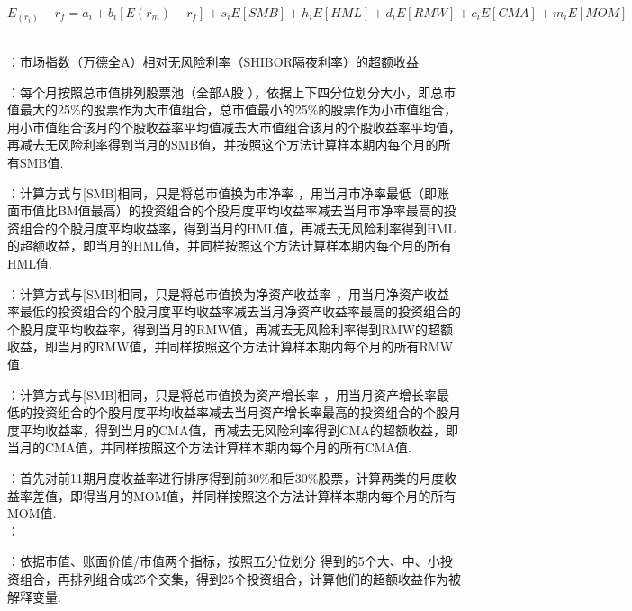 \documentclass[11pt]{article}
\begin{document}
    \noindent {}
    $$E_( r_i)-r_f=a_i+b_i [E(r_m)-r_f]+s_i E[SMB]+h_i E[HML]+d_i E[RMW]+c_i E[CMA]+m_i E[MOM]$$
    \\
    \par \indent
    \heiti{$[E(r_m)-r_f]$}：市场指数（万德全A）相对无风险利率（SHIBOR隔夜利率）的超额收益\\
    \par \indent
    \heiti{$[SMB]$}：每个月按照总市值排列股票池（全部A股  ），依据上下四分位划分大小，即总市值最大的25\%的股票作为大市值组合，总市值最小的25\%的股票作为小市值组合，用小市值组合该月的个股收益率平均值减去大市值组合该月的个股收益率平均值，再减去无风险利率得到当月的SMB值，并按照这个方法计算样本期内每个月的所有SMB值.\\
    \par \indent
    \heiti{$[HML]$}：计算方式与[SMB]相同，只是将总市值换为市净率 ，用当月市净率最低（即账面市值比BM值最高）的投资组合的个股月度平均收益率减去当月市净率最高的投资组合的个股月度平均收益率，得到当月的HML值，再减去无风险利率得到HML的超额收益，即当月的HML值，并同样按照这个方法计算样本期内每个月的所有HML值.\\
    \par \indent
    \heiti{$[RMW]$}：计算方式与[SMB]相同，只是将总市值换为净资产收益率 ，用当月净资产收益率最低的投资组合的个股月度平均收益率减去当月净资产收益率最高的投资组合的个股月度平均收益率，得到当月的RMW值，再减去无风险利率得到RMW的超额收益，即当月的RMW值，并同样按照这个方法计算样本期内每个月的所有RMW值.\\
    \par \indent
    \heiti{$[CMA]$}：计算方式与[SMB]相同，只是将总市值换为资产增长率 ，用当月资产增长率最低的投资组合的个股月度平均收益率减去当月资产增长率最高的投资组合的个股月度平均收益率，得到当月的CMA值，再减去无风险利率得到CMA的超额收益，即当月的CMA值，并同样按照这个方法计算样本期内每个月的所有CMA值.\\
    \par \indent
    \heiti{$[MOM]$}：首先对前11期月度收益率进行排序得到前30\%和后30\%股票，计算两类的月度收益率差值，即得当月的MOM值，并同样按照这个方法计算样本期内每个月的所有MOM值.\\
    ：\\
    \par \indent
    ：依据市值、账面价值/市值两个指标，按照五分位划分 得到的5个大、中、小投资组合，再排列组合成25个交集，得到25个投资组合，计算他们的超额收益作为被解释变量.\\
\end{document}
